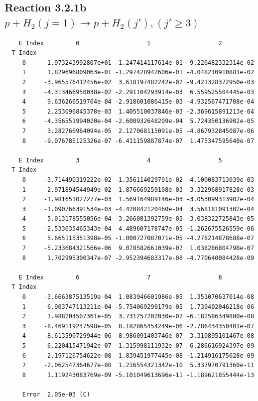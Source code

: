 \documentclass[12pt,dvipdfmx]{article}
\begin{document}
\newpage
\subsection{
Reaction 3.2.1b $  p + H_2(j=1) \rightarrow p + H_2(j'), (j' \geq 3)$}


\begin{small}\begin{verbatim}
    E Index         0                   1                   2
  T Index
     0     -1.973243992807e+01  1.247414117614e-01  9.226482332314e-02
     1      1.829696809063e-01 -1.297428942606e-01 -4.048210910881e-02
     2     -3.965576412456e-02  3.618197482242e-02 -9.421328372950e-03
     3     -4.313466950038e-02 -2.291104293914e-03  6.559525504445e-03
     4      9.636266519704e-04 -2.918601086415e-03 -4.932567471708e-04
     5      2.253096845378e-03  1.405510037846e-03 -2.369615891213e-04
     6     -4.356551994020e-04 -2.600932648209e-04  5.724350136902e-05
     7      3.282766964094e-05  2.127068115091e-05 -4.867932845087e-06
     8     -9.076785125326e-07 -6.411159887874e-07  1.475347595640e-07

    E Index         3                   4                   5
  T Index
     0     -3.714490319222e-02 -1.356114029701e-02  4.100083713039e-03
     1      2.971894544949e-02  1.876669259108e-03 -3.322968917828e-03
     2     -1.981651027277e-03  1.569164989146e-03 -3.053099313902e-04
     3     -1.090766391534e-03 -4.420842120460e-04  3.568181091302e-04
     4      5.013178555056e-04 -3.266081392759e-05 -3.038322725843e-05
     5     -2.533635465343e-04  4.489607178747e-05 -1.262675526559e-06
     6      5.665115351398e-05 -1.000727087071e-05 -4.278214878688e-07
     7     -5.233684321566e-06  9.078582661039e-07  1.038286804798e-07
     8      1.702995300347e-07 -2.952394683317e-08 -4.770640084428e-09

    E Index         6                   7                   8
  T Index
     0     -3.666387513519e-04  1.083946601986e-05  1.351070637014e-08
     1      6.903747113211e-04 -5.754069299179e-05  1.739402046218e-06
     2      1.988204507361e-05  3.731257202030e-07 -6.182586349800e-08
     3     -8.469119247598e-05  8.182865454249e-06 -2.786434350401e-07
     4      8.613590729944e-06 -8.986091403746e-07  3.310895101467e-08
     5      6.220415471942e-07 -1.315998111932e-07  6.286616924397e-09
     6      2.197126754622e-08  1.839451977445e-08 -1.214916175628e-09
     7     -2.062547364677e-08  1.216554321342e-10  5.337970791360e-11
     8      1.119243083769e-09 -5.101049613696e-11 -1.189621855444e-13

     Error  2.05e-03 (C)
\end{verbatim}\end{small}
\end{document}
